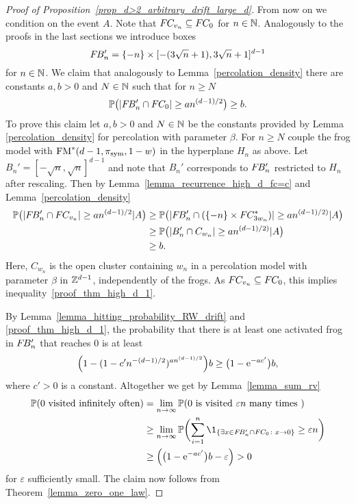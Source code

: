 \begin{proof}[Proof of Proposition~\ref{prop_d>2_arbitrary_drift_large_d}]
From now on we condition on the event $A$. Note that $F\hspace{-0.04em}C_{v_n} \subseteq F\hspace{-0.04em}C_0$ for $n\in\mathbb{N}$.
Analogously to the proofs in the last sections we introduce boxes 
\begin{equation*}
F\hspace{-0.1em}B_n' = \{-n\} \times [-(3\sqrt{n}+1), 3\sqrt{n}+1]^{d-1} 
\end{equation*}
for $n \in \mathbb{N}$. 
We claim that analogously to Lemma~\ref{percolation_density} there are constants $a, b>0$ and $N \in \mathbb{N}$ such that for $n \geq N$
\begin{equation} \label{proof_thm_high_d_1}
 \mathbb{P}\bigl(\lvert F\hspace{-0.1em}B_n' \cap F\hspace{-0.04em}C_0\rvert \geq a n^{(d-1)/2}\bigr) \geq b.
\end{equation}
To prove this claim let $a,b>0$ and $N \in \mathbb{N}$ be the constants provided by Lemma \ref{percolation_density} for percolation with parameter $\beta$. For $n \geq N$ couple the frog model with $\operatorname{FM}^*(d-1, \pi_{\text{sym}}, 1-w)$ in the hyperplane $H_n$ as above. Let $B_n' = [-\sqrt{n}, \sqrt{n}]^{d-1}$ and note that $B_n'$ corresponds to $F\hspace{-0.1em}B_n'$ restricted to $H_n$ after rescaling. Then by Lemma~\ref{lemma_recurrence_high_d_fc=c} and Lemma~\ref{percolation_density}
\begin{align*}
 \mathbb{P} \bigl(\lvert F\hspace{-0.1em}B_n' \cap F\hspace{-0.04em}C_{v_n}\rvert \geq a n^{(d-1)/2 } | A \bigr)
    &\geq \mathbb{P} \bigl(\lvert F\hspace{-0.1em}B_n' \cap (\{-n\} \times F\hspace{-0.04em}C_{3w_n}^*)\rvert \geq a n^{(d-1)/2) } | A \bigr) \\
    &\geq \mathbb{P}\bigl(\lvert B_n' \cap C_{w_n}\rvert \geq a n^{(d-1)/2)}  | A \bigr) \\
    &\geq b.
\end{align*}
Here, $C_{w_n}$ is the open cluster containing $w_n$ in a percolation model with parameter $\beta$ in $\mathbb{Z}^{d-1}$, independently of the frogs.
As $F\hspace{-0.04em}C_{v_n} \subseteq F\hspace{-0.04em}C_0$, this implies inequality~\eqref{proof_thm_high_d_1}.

By Lemma~\ref{lemma_hitting_probability_RW_drift} and \eqref{proof_thm_high_d_1}, the probability that there is at least one activated frog in $F\hspace{-0.1em}B_n'$ that reaches $0$ is at least
\begin{equation*}
 \Bigl(1-(1-c'n^{-(d-1)/2})^{an^{(d-1)/2}}\Bigr)b \geq \bigl(1 - \mathrm{e}^{-ac'}\bigr)b,
\end{equation*}
where $c'>0$ is a constant. Altogether we get by Lemma~\ref{lemma_sum_rv}
\begin{align*}
 \P(\text{$0$ visited infinitely often}) &=    \lim_{n \to \infty} \P(\text{$0$ is visited $\varepsilon n$ many times }) \\
                                         &\geq \lim_{n \to \infty} \P\biggl( \sum_{i=1}^n \1_{\{\exists x \in \fb_n' \cap \fc_{0} \colon x \to 0 \}} \geq \varepsilon n \biggr)\\
                                         &\geq \Bigl(\bigl(1 - \e^{-ac'}\bigr)b - \varepsilon \Bigr) > 0
\end{align*}
for $\varepsilon$ sufficiently small. The claim now follows from Theorem~\ref{lemma_zero_one_law}.
\end{proof}



